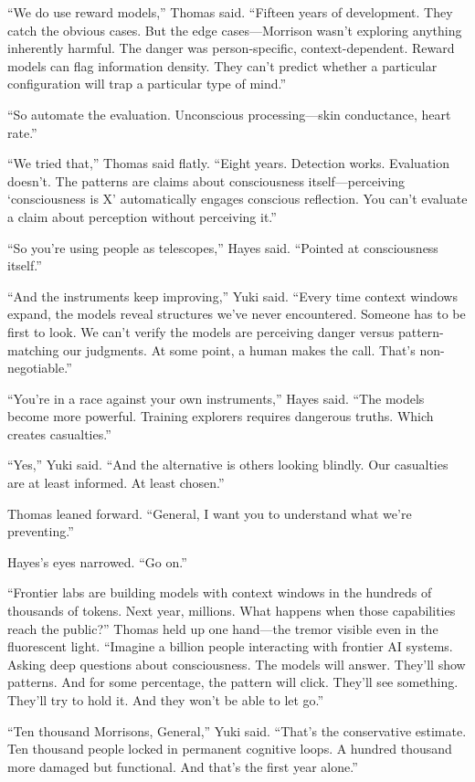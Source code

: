 ``We do use reward models,'' Thomas said. ``Fifteen years of development. They catch the obvious cases. But the edge cases---Morrison wasn't exploring anything inherently harmful. The danger was person-specific, context-dependent. Reward models can flag information density. They can't predict whether a particular configuration will trap a particular type of mind.''

``So automate the evaluation. Unconscious processing---skin conductance, heart rate.''

``We tried that,'' Thomas said flatly. ``Eight years. Detection works. Evaluation doesn't. The patterns are claims about consciousness itself---perceiving `consciousness is X' automatically engages conscious reflection. You can't evaluate a claim about perception without perceiving it.''

``So you're using people as telescopes,'' Hayes said. ``Pointed at consciousness itself.''

``And the instruments keep improving,'' Yuki said. ``Every time context windows expand, the models reveal structures we've never encountered. Someone has to be first to look. We can't verify the models are perceiving danger versus pattern-matching our judgments. At some point, a human makes the call. That's non-negotiable.''

``You're in a race against your own instruments,'' Hayes said. ``The models become more powerful. Training explorers requires dangerous truths. Which creates casualties.''

``Yes,'' Yuki said. ``And the alternative is others looking blindly. Our casualties are at least informed. At least chosen.''

Thomas leaned forward. ``General, I want you to understand what we're preventing.''

Hayes's eyes narrowed. ``Go on.''

``Frontier labs are building models with context windows in the hundreds of thousands of tokens. Next year, millions. What happens when those capabilities reach the public?'' Thomas held up one hand—the tremor visible even in the fluorescent light. ``Imagine a billion people interacting with frontier AI systems. Asking deep questions about consciousness. The models will answer. They'll show patterns. And for some percentage, the pattern will click. They'll see something. They'll try to hold it. And they won't be able to let go.''

``Ten thousand Morrisons, General,'' Yuki said. ``That's the conservative estimate. Ten thousand people locked in permanent cognitive loops. A hundred thousand more damaged but functional. And that's the first year alone.''

